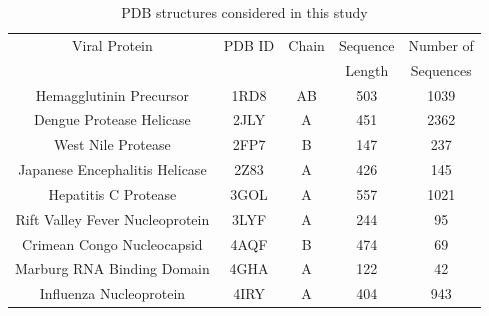 \documentclass[12pt]{article}
\begin{document}
\begin{table}[htbp]
\begin{center}
\caption{PDB structures considered in this study \label{tab:pdb_names}}
\begin{tabular}{c c c c c} %
                        \hline
    Viral Protein   &  PDB ID  & Chain    & Sequence  & Number of   \\ 
    &    &       & Length    & Sequences   \\\hline                                                           
  Hemagglutinin Precursor         & 1RD8           & AB        & 503                & 1039        \\ %
  Dengue Protease Helicase        & 2JLY           & A         & 451                & 2362        \\ %
  West Nile Protease              & 2FP7           & B         & 147                & 237         \\ %
  Japanese Encephalitis Helicase  & 2Z83           & A         & 426                & 145         \\ %
  Hepatitis C Protease            & 3GOL           & A         & 557                & 1021        \\ %
  Rift Valley Fever Nucleoprotein & 3LYF           & A         & 244                & 95          \\ %
  Crimean Congo Nucleocapsid      & 4AQF           & B         & 474                & 69          \\ %
  Marburg RNA Binding Domain      & 4GHA           & A         & 122                & 42          \\ %
  Influenza Nucleoprotein         & 4IRY           & A         & 404                & 943         \\ %
  \hline
\end{tabular}
\end{center}
\end{table}
\end{document}
